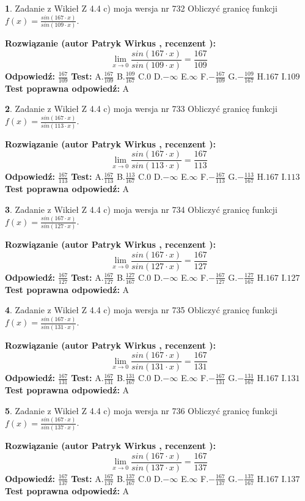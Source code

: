\documentclass[12pt, a4paper]{article}
\theoremstyle{definition} %
\newtheorem{zad}{}
\newcommand{\zadStart}[1]{\begin{zad}#1\newline}
\newcommand{\zadStop}{\end{zad}}
\newcommand{\rozwStart}[2]{\noindent \textbf{Rozwiązanie (autor #1 , recenzent #2): }\newline}
\newcommand{\rozwStop}{\newline}
\newcommand{\odpStart}{\noindent \textbf{Odpowiedź:}\newline}
\newcommand{\odpStop}{\newline}
\newcommand{\testStart}{\noindent \textbf{Test:}\newline}
\newcommand{\testStop}{\newline}
\newcommand{\kluczStart}{\noindent \textbf{Test poprawna odpowiedź:}\newline}
\newcommand{\kluczStop}{\newline}
\begin{document}
\zadStart{Zadanie z Wikieł Z 4.4 c) moja wersja nr 732}
Obliczyć granicę funkcji $f(x)=\frac{sin(167\cdot x)}{sin(109\cdot x)}$.
\zadStop
\rozwStart{Patryk Wirkus}{}
$$\lim\limits_{x\to 0}\frac{sin(167\cdot x)}{sin(109\cdot x)}=
\frac{167}{109}$$
\rozwStop
\odpStart
$\frac{167}{109}$
\odpStop
\testStart
A.$\frac{167}{109}$
B.$\frac{109}{167}$
C.$0$
D.$-\infty$
E.$\infty$
F.$-\frac{167}{109}$
G.$-\frac{109}{167}$
H.$167$
I.$109$
\testStop
\kluczStart
A
\kluczStop



\zadStart{Zadanie z Wikieł Z 4.4 c) moja wersja nr 733}
Obliczyć granicę funkcji $f(x)=\frac{sin(167\cdot x)}{sin(113\cdot x)}$.
\zadStop
\rozwStart{Patryk Wirkus}{}
$$\lim\limits_{x\to 0}\frac{sin(167\cdot x)}{sin(113\cdot x)}=
\frac{167}{113}$$
\rozwStop
\odpStart
$\frac{167}{113}$
\odpStop
\testStart
A.$\frac{167}{113}$
B.$\frac{113}{167}$
C.$0$
D.$-\infty$
E.$\infty$
F.$-\frac{167}{113}$
G.$-\frac{113}{167}$
H.$167$
I.$113$
\testStop
\kluczStart
A
\kluczStop



\zadStart{Zadanie z Wikieł Z 4.4 c) moja wersja nr 734}
Obliczyć granicę funkcji $f(x)=\frac{sin(167\cdot x)}{sin(127\cdot x)}$.
\zadStop
\rozwStart{Patryk Wirkus}{}
$$\lim\limits_{x\to 0}\frac{sin(167\cdot x)}{sin(127\cdot x)}=
\frac{167}{127}$$
\rozwStop
\odpStart
$\frac{167}{127}$
\odpStop
\testStart
A.$\frac{167}{127}$
B.$\frac{127}{167}$
C.$0$
D.$-\infty$
E.$\infty$
F.$-\frac{167}{127}$
G.$-\frac{127}{167}$
H.$167$
I.$127$
\testStop
\kluczStart
A
\kluczStop



\zadStart{Zadanie z Wikieł Z 4.4 c) moja wersja nr 735}
Obliczyć granicę funkcji $f(x)=\frac{sin(167\cdot x)}{sin(131\cdot x)}$.
\zadStop
\rozwStart{Patryk Wirkus}{}
$$\lim\limits_{x\to 0}\frac{sin(167\cdot x)}{sin(131\cdot x)}=
\frac{167}{131}$$
\rozwStop
\odpStart
$\frac{167}{131}$
\odpStop
\testStart
A.$\frac{167}{131}$
B.$\frac{131}{167}$
C.$0$
D.$-\infty$
E.$\infty$
F.$-\frac{167}{131}$
G.$-\frac{131}{167}$
H.$167$
I.$131$
\testStop
\kluczStart
A
\kluczStop



\zadStart{Zadanie z Wikieł Z 4.4 c) moja wersja nr 736}
Obliczyć granicę funkcji $f(x)=\frac{sin(167\cdot x)}{sin(137\cdot x)}$.
\zadStop
\rozwStart{Patryk Wirkus}{}
$$\lim\limits_{x\to 0}\frac{sin(167\cdot x)}{sin(137\cdot x)}=
\frac{167}{137}$$
\rozwStop
\odpStart
$\frac{167}{137}$
\odpStop
\testStart
A.$\frac{167}{137}$
B.$\frac{137}{167}$
C.$0$
D.$-\infty$
E.$\infty$
F.$-\frac{167}{137}$
G.$-\frac{137}{167}$
H.$167$
I.$137$
\testStop
\kluczStart
A
\kluczStop
\end{document}
